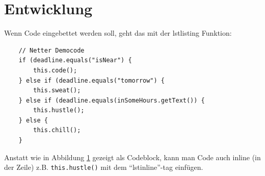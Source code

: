 \section{Entwicklung}\label{sec:development}
Wenn Code eingebettet werden soll, geht das mit der lstlisting Funktion:
\begin{lstlisting}
    // Netter Democode
	if (deadline.equals("isNear") {
		this.code();
	} else if (deadline.equals("tomorrow") {
		this.sweat();
	} else if (deadline.equals(inSomeHours.getText()) {
		this.hustle();
	} else {
		this.chill();
	}
\end{lstlisting}

Anstatt wie in Abbildung \ref{sec:development} gezeigt als Codeblock, kann man Code auch inline (in der Zeile) z.B. \lstinline{this.hustle()} mit dem \enquote{lstinline}-tag einfügen. 
